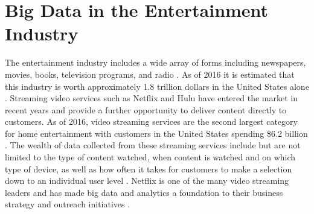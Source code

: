 \documentclass[sigconf]{acmart}
\begin{document}
 \section{Big Data in the Entertainment Industry}
The entertainment industry includes a wide array of forms including newspapers, movies, books, television programs, and radio \cite{Griffith2017}. As of 2016 it is estimated that this industry is worth approximately 1.8 trillion dollars in the United States alone \cite{Statista2017}. Streaming video services such as Netflix and Hulu have entered the market in recent years and provide a further opportunity to deliver content directly to customers. As of 2016, video streaming services are the second largest category for home entertainment with customers in the United States spending \$6.2 billion \cite{Atkinson2016}. The wealth of data collected from these streaming services include but are not limited to the type of content watched, when content is watched and on which type of device, as well as how often it takes for customers to make a selection down to an individual user level \cite{Cohen2017}. Netflix is one of the many video streaming leaders and has made big data and analytics a foundation to their business strategy and outreach initiatives \cite{Jenkins2016}. 
\end{document}
